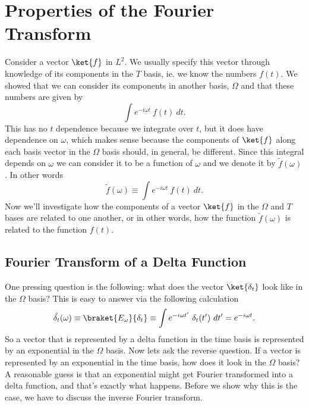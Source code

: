 \section{Properties of the Fourier Transform}

Consider a vector $\ket{f}$ in $L^2$.  We usually specify this vector through knowledge of its components in the $T$ basis, ie. we know the numbers $f(t)$.  We showed that we can consider its components in another basis, $\Omega$ and that these numbers are given by
\begin{displaymath} \int e^{-i\omega t}~f(t)~dt. \end{displaymath}
This has no $t$ dependence because we integrate over $t$, but it does have dependence on $\omega$, which makes sense because the components of $\ket{f}$ along each basis vector in the $\Omega$ basis should, in general, be different.  Since this integral depends on $\omega$ we can consider it to be a function of $\omega$ and we denote it by $\tilde{f}(\omega)$.  In other words
\begin{displaymath} \tilde{f}(\omega) \equiv \int e^{-i\omega t}~f(t)~dt. \end{displaymath}
Now we'll investigate how the components of a vector $\ket{f}$ in the $\Omega$ and $T$ bases are related to one another, or in other words, how the function $\tilde{f}(\omega)$ is related to the function $f(t)$.

\subsection{Fourier Transform of a Delta Function}
One pressing question is the following: what does the vector $\ket{\delta_t}$ look like in the $\Omega$ basis?  This is easy to answer via the following calculation
\begin{displaymath} \tilde{\delta_t} (\omega) \equiv \braket{E_\omega}{\delta_t} \equiv \int e^{-i\omega t'}~\delta_t (t')~dt' = e^{-i\omega t}.\end{displaymath}
So a vector that is represented by a delta function in the time basis is represented by an exponential in the $\Omega$ basis.  Now lets ask the reverse question.  If a vector is represented by an exponential in the time basis, how does it look in the $\Omega$ basis?  A reasonable guess is that an exponential might get Fourier transformed into a delta function, and that's exactly what happens.  Before we show why this is the case, we have to discuss the inverse Fourier transform.

